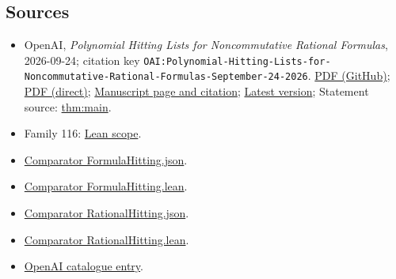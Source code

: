 \documentclass[11pt]{article}
\begin{document}
\subsection{Sources}
\begin{itemize}
\item OpenAI, \emph{Polynomial Hitting Lists for Noncommutative Rational Formulas}, 2026-09-24; citation key \texttt{OAI:Polynomial-Hitting-Lists-for-Noncommutative-Rational-Formulas-September-24-2026}. \href{https://github.com/openai/math/blob/adc7f1241b42e322a6451854ab7e4b4c146bf78a/preprints/Polynomial-Hitting-Lists-for-Noncommutative-Rational-Formulas-September-24-2026/Polynomial-Hitting-Lists-for-Noncommutative-Rational-Formulas-September-24-2026.pdf}{PDF (GitHub)}; \href{https://github.com/openai/math/raw/adc7f1241b42e322a6451854ab7e4b4c146bf78a/preprints/Polynomial-Hitting-Lists-for-Noncommutative-Rational-Formulas-September-24-2026/Polynomial-Hitting-Lists-for-Noncommutative-Rational-Formulas-September-24-2026.pdf}{PDF (direct)}; \href{https://github.com/openai/math/blob/adc7f1241b42e322a6451854ab7e4b4c146bf78a/preprints/Polynomial-Hitting-Lists-for-Noncommutative-Rational-Formulas-September-24-2026/README.md}{Manuscript page and citation}; \href{https://github.com/openai/math/blob/main/preprints/Polynomial-Hitting-Lists-for-Noncommutative-Rational-Formulas-September-24-2026/Polynomial-Hitting-Lists-for-Noncommutative-Rational-Formulas-September-24-2026.pdf}{Latest version}; Statement source: \href{https://github.com/openai/math/blob/adc7f1241b42e322a6451854ab7e4b4c146bf78a/preprints/Polynomial-Hitting-Lists-for-Noncommutative-Rational-Formulas-September-24-2026/build/sections/introduction.tex\#L20}{thm:main}.
\item Family 116: \href{https://github.com/openai/math/blob/adc7f1241b42e322a6451854ab7e4b4c146bf78a/lean/docs/116.md}{Lean scope}.
\item \href{https://github.com/openai/math/blob/adc7f1241b42e322a6451854ab7e4b4c146bf78a/lean/ComparatorChallenges/FormulaHitting.json}{Comparator FormulaHitting.json}.
\item \href{https://github.com/openai/math/blob/adc7f1241b42e322a6451854ab7e4b4c146bf78a/lean/ComparatorChallenges/FormulaHitting.lean}{Comparator FormulaHitting.lean}.
\item \href{https://github.com/openai/math/blob/adc7f1241b42e322a6451854ab7e4b4c146bf78a/lean/ComparatorChallenges/RationalHitting.json}{Comparator RationalHitting.json}.
\item \href{https://github.com/openai/math/blob/adc7f1241b42e322a6451854ab7e4b4c146bf78a/lean/ComparatorChallenges/RationalHitting.lean}{Comparator RationalHitting.lean}.
\item \href{https://github.com/openai/math/blob/adc7f1241b42e322a6451854ab7e4b4c146bf78a/CONTENTS.md}{OpenAI catalogue entry}.
\end{itemize}
\end{document}
